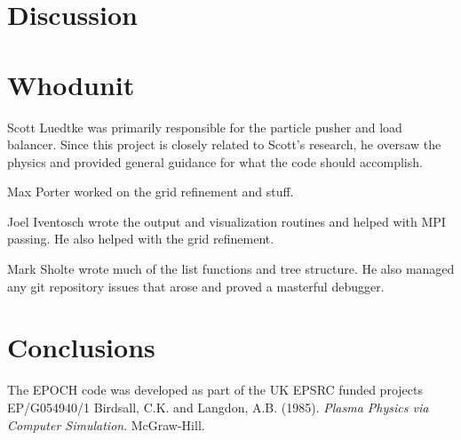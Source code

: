 \documentclass[]{article}
\begin{document}
\section{Discussion}

\section{Whodunit}
Scott Luedtke was primarily responsible for the particle pusher and load balancer.  Since this project is closely related to Scott's research, he oversaw the physics and provided general guidance for what the code should accomplish.

Max Porter worked on the grid refinement and stuff.

Joel Iventosch wrote the output and visualization routines and helped with MPI passing.  He also helped with the grid refinement.

Mark Sholte wrote much of the list functions and tree structure.  He also managed any git repository issues that arose and proved a masterful debugger.

\section{Conclusions}
























{\def\section*#1{}
\begin{thebibliography}{1}
\setlength{\itemsep}{0pt}
The EPOCH code was developed as part of the UK EPSRC funded projects EP/G054940/1
Birdsall, C.K. and Langdon, A.B.  (1985). \textit{Plasma Physics via Computer Simulation}. McGraw-Hill.

\end{thebibliography}
}
\end{document}
